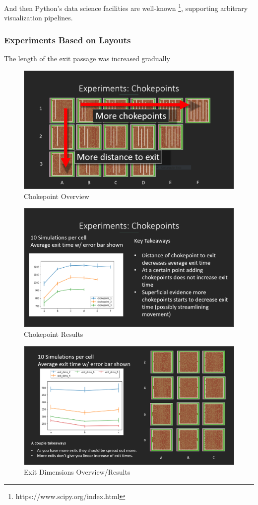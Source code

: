 \documentclass[12pt,letterpaper]{article}
\begin{document}
And then Python's data science facilities are well-known \footnote{https://www.scipy.org/index.html}, supporting arbitrary
visualization pipelines.

\subsubsection{Experiments Based on Layouts}
The length of the exit passage was increased gradually
\begin{figure}
  \includegraphics[width=\linewidth]{./figures/chokepoints_summary.png}
  \caption{Chokepoint Overview}
\end{figure}
\begin{figure}
  \includegraphics[width=\linewidth]{./figures/chokepoints_chart.png}
  \caption{Chokepoint Results}
\end{figure}
\begin{figure}
  \includegraphics[width=\linewidth]{./figures/exit_dims_summary.png}
  \caption{Exit Dimensions Overview/Results}
\end{figure}
\end{document}
